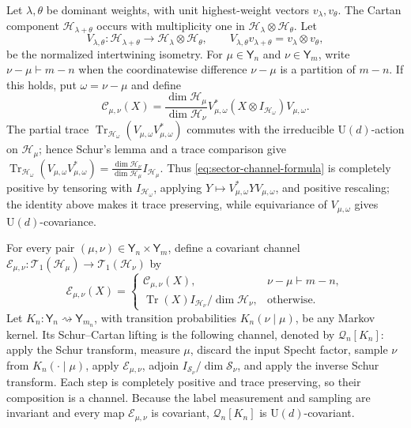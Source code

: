 \documentclass[11pt]{article}
\theoremstyle{remark}
\theoremstyle{plain}
\newcommand{\cC}{\mathcal C}
\newcommand{\cE}{\mathcal E}
\newcommand{\cH}{\mathcal H}
\newcommand{\cS}{\mathcal S}
\newcommand{\cT}{\mathcal T}
\newcommand{\U}{\mathrm U}
\newcommand{\Tr}{\operatorname{Tr}}
\newcommand{\ot}{\otimes}
\begin{document}
Let \(\lambda,\theta\) be dominant weights, with unit highest-weight vectors
\(v_\lambda,v_\theta\).  The Cartan component \(\cH_{\lambda+\theta}\)
occurs with multiplicity one in \(\cH_\lambda\ot\cH_\theta\).  Let
\begin{equation}\label{eq:cartan-inclusion}
  V_{\lambda,\theta}:\cH_{\lambda+\theta}
  \longrightarrow\cH_\lambda\ot\cH_\theta,
  \qquad
  V_{\lambda,\theta}v_{\lambda+\theta}=v_\lambda\ot v_\theta,
\end{equation}
be the normalized intertwining isometry.  For \(\mu\in\mathsf Y_n\) and
\(\nu\in\mathsf Y_m\), write \(\nu-\mu\vdash m-n\) when the coordinatewise
difference \(\nu-\mu\) is a partition of \(m-n\).  If this holds, put
\(\omega=\nu-\mu\) and define
\begin{equation}\label{eq:sector-channel-formula}
  \cC_{\mu,\nu}(X)
  =\frac{\dim\cH_\mu}{\dim\cH_\nu}
  V_{\mu,\omega}^*(X\ot I_{\cH_\omega})V_{\mu,\omega}.
\end{equation}
The partial trace
\(\Tr_{\cH_\omega}(V_{\mu,\omega}V_{\mu,\omega}^*)\) commutes with the
irreducible \(\U(d)\)-action on \(\cH_\mu\); hence Schur's lemma and a trace
comparison give
\(
  \Tr_{\cH_\omega}(V_{\mu,\omega}V_{\mu,\omega}^*)
  =\frac{\dim\cH_\nu}{\dim\cH_\mu}I_{\cH_\mu}
\).
Thus \eqref{eq:sector-channel-formula} is completely positive by
tensoring with \(I_{\cH_\omega}\), applying
\(Y\mapsto V_{\mu,\omega}^*YV_{\mu,\omega}\), and positive rescaling;
the identity above makes it trace
preserving, while equivariance of \(V_{\mu,\omega}\) gives
\(\U(d)\)-covariance.

For every pair \((\mu,\nu)\in\mathsf Y_n\times\mathsf Y_m\), define a
covariant channel \(\cE_{\mu,\nu}:\cT_1(\cH_\mu)\to\cT_1(\cH_\nu)\) by
\[
  \cE_{\mu,\nu}(X)=
  \begin{cases}
    \cC_{\mu,\nu}(X),&\nu-\mu\vdash m-n,\\[1mm]
    \Tr(X)I_{\cH_\nu}/\dim\cH_\nu,&\text{otherwise}.
  \end{cases}
\]
Let \(K_n:\mathsf Y_n\rightsquigarrow\mathsf Y_{m_n}\), with transition
probabilities \(K_n(\nu\mid\mu)\), be any Markov kernel.  Its Schur--Cartan
lifting is the following channel,
denoted by \(\mathcal Q_n[K_n]\): apply the Schur transform, measure
\(\mu\), discard the input Specht factor, sample \(\nu\) from
\(K_n(\cdot\mid\mu)\), apply \(\cE_{\mu,\nu}\), adjoin
\(I_{\cS_\nu}/\dim\cS_\nu\), and apply the inverse Schur transform.  Each
step is completely positive and trace preserving, so their composition is a
channel.  Because the label measurement and sampling are invariant and every
map \(\cE_{\mu,\nu}\) is covariant, \(\mathcal Q_n[K_n]\) is
\(\U(d)\)-covariant.
\end{document}
